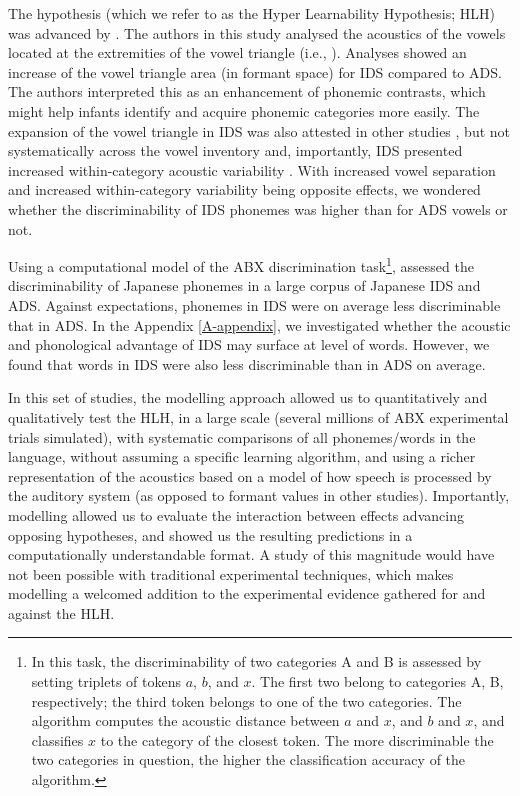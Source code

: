 The hypothesis (which we refer to as the Hyper Learnability Hypothesis; HLH) was advanced by \cite{kuhl1997}. The authors in this study analysed the acoustics of the vowels located at the extremities of the vowel triangle (i.e., ). Analyses showed an increase of the vowel triangle area (in formant space) for IDS compared to ADS. The authors interpreted this as an enhancement of phonemic contrasts, which might help infants identify and acquire phonemic categories more easily. The expansion of the vowel triangle in IDS was also attested in other studies \cite{andruski1999, bernstein1984, burnham2002, cristia2014, liu2003, mcmurray2013, uther2007}, but not systematically across the vowel inventory \cite{cristia2014} and, importantly, IDS presented increased within-category acoustic variability \cite{mcmurray2013, cristia2014, kirchoff2005}. With increased vowel separation and increased within-category variability being opposite effects, we wondered whether the discriminability of IDS phonemes was higher than for ADS vowels or not.

Using a computational model of the ABX discrimination task\footnote{In this task, the discriminability of two categories \textsc{A} and \textsc{B} is assessed by setting triplets of tokens $a$, $b$, and $x$. The first two belong to categories \textsc{A}, \textsc{B}, respectively; the third token belongs to one of the two categories. The algorithm computes the acoustic distance between $a$ and $x$, and $b$ and $x$, and classifies $x$ to the category of the closest token. The more discriminable the two categories in question, the higher the classification accuracy of the algorithm.}, \cite{martin2015} assessed the discriminability of Japanese phonemes in a large corpus of Japanese IDS and ADS. Against expectations, phonemes in IDS were on average less discriminable that in ADS. In the Appendix \ref{A-appendix}, we investigated whether the acoustic and phonological advantage of IDS may surface at level of words. However, we found that words in IDS were also less discriminable than in ADS on average. 

In this set of studies, the modelling approach allowed us to quantitatively and qualitatively test the HLH, in a large scale (several millions of ABX experimental trials simulated), with systematic comparisons of all phonemes/words in the language, without assuming a specific learning algorithm, and using a richer representation of the acoustics based on a model of how speech is processed by the auditory system (as opposed to formant values in other studies). Importantly, modelling allowed us to evaluate the interaction between effects advancing opposing hypotheses, and showed us the resulting predictions in a computationally understandable format. A study of this magnitude would have not been possible with traditional experimental techniques, which makes modelling a welcomed addition to the experimental evidence gathered for and against the HLH.

